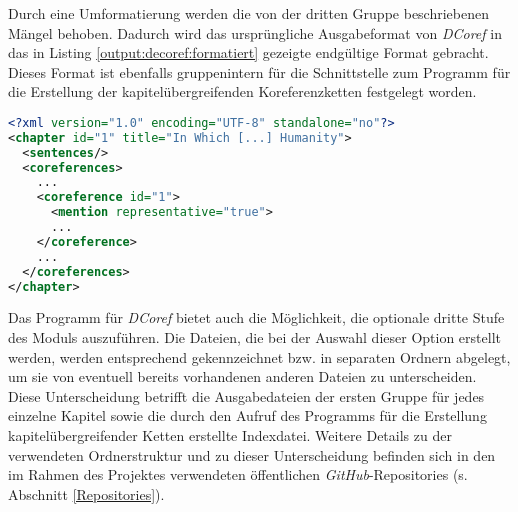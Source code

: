 \noindent Durch eine Umformatierung werden die von der dritten Gruppe beschriebenen Mängel behoben. Dadurch wird das ursprüngliche Ausgabeformat von \emph{DCoref} in das in Listing \ref{output:decoref:formatiert} gezeigte endgültige Format gebracht. Dieses Format ist ebenfalls gruppenintern für die Schnittstelle zum Programm für die Erstellung der kapitelübergreifenden Koreferenzketten festgelegt worden.   

\begin{lstlisting}[label=output:decoref:formatiert, name=decoref_out_formatted.xml, language=xml, caption={XML, Formatierte Ausgabe von \emph{DCoref}}]
<?xml version="1.0" encoding="UTF-8" standalone="no"?>
<chapter id="1" title="In Which [...] Humanity">
  <sentences/>
  <coreferences>
    ...
    <coreference id="1">
      <mention representative="true">
      ...
    </coreference>
    ...
  </coreferences>
</chapter>
\end{lstlisting}

\noindent Das Programm für \emph{DCoref} bietet auch die Möglichkeit, die optionale dritte Stufe des Moduls auszuführen. Die Dateien, die bei der Auswahl dieser Option erstellt werden, werden entsprechend gekennzeichnet bzw. in separaten Ordnern abgelegt, um sie von eventuell bereits vorhandenen anderen Dateien zu unterscheiden. Diese Unterscheidung betrifft die Ausgabedateien der ersten Gruppe für jedes einzelne Kapitel sowie die durch den Aufruf des Programms für die Erstellung kapitelübergreifender Ketten erstellte Indexdatei. Weitere Details zu der verwendeten Ordnerstruktur und zu dieser Unterscheidung befinden sich in den im Rahmen des Projektes verwendeten öffentlichen \emph{GitHub}-Repositories (s. Abschnitt \ref{Repositories}).
